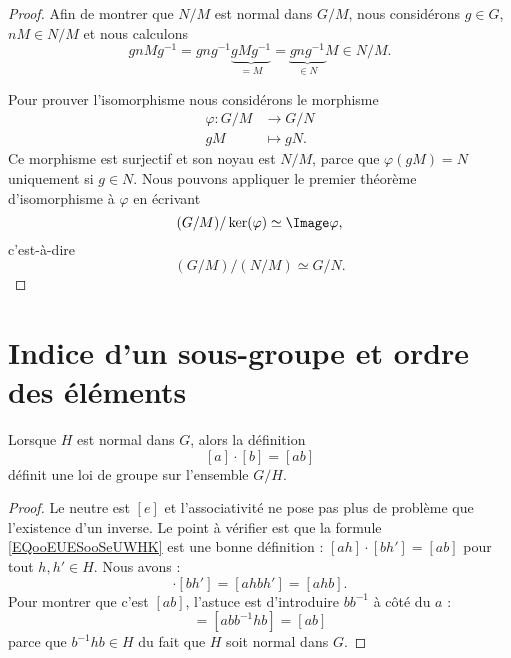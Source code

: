 \begin{proof}
	Afin de montrer que \( N/M\) est normal dans \( G/M\), nous considérons \( g\in G\), \( nM\in N/M\) et nous calculons
	\begin{equation}
		gnMg^{-1}=gng^{-1}\underbrace{gMg^{-1}}_{=M}=\underbrace{gng^{-1}}_{\in N}M\in N/M.
	\end{equation}

	Pour prouver l'isomorphisme nous considérons le morphisme
	\begin{equation}
		\begin{aligned}
			\varphi\colon G/M & \to G/N     \\
			gM                & \mapsto gN.
		\end{aligned}
	\end{equation}
	Ce morphisme est surjectif et son noyau est \( N/M\), parce que \( \varphi(gM)=N\) uniquement si \( g\in N\). Nous pouvons appliquer le premier théorème d'isomorphisme à \( \varphi\) en écrivant
	\begin{equation}
		(G/M)/\ker(\varphi)\simeq\Image \varphi,
	\end{equation}
	c'est-à-dire
	\begin{equation}
		(G/M)/(N/M)\simeq G/N.
	\end{equation}
\end{proof}

\section{Indice d'un sous-groupe et ordre des éléments}

\begin{lemma}       \label{LEMooFNVRooRCkjLc}
	Lorsque \( H\) est normal dans \( G\), alors la définition
	\begin{equation}        \label{EQooEUESooSeUWHK}
		[a]\cdot[b]=[ab]
	\end{equation}
	définit une loi de groupe sur l'ensemble \( G/H\).
\end{lemma}

\begin{proof}
	Le neutre est \( [e]\) et l'associativité ne pose pas plus de problème que l'existence d'un inverse. Le point à vérifier est que la formule \eqref{EQooEUESooSeUWHK} est une bonne définition : \( [ah]\cdot [bh']=[ab]\) pour tout \( h,h'\in H\). Nous avons :
	\begin{equation}
		[ah]\cdot [bh']=[ahbh']=[ahb].
	\end{equation}
	Pour montrer que c'est \( [ab]\), l'astuce est d'introduire \( bb^{-1}\) à côté du \( a\) :
	\begin{equation}
		[ahb]=[abb^{-1}hb]=[ab]
	\end{equation}
	parce que \( b^{-1} hb\in H\) du fait que \( H\) soit normal dans \( G\).
\end{proof}

